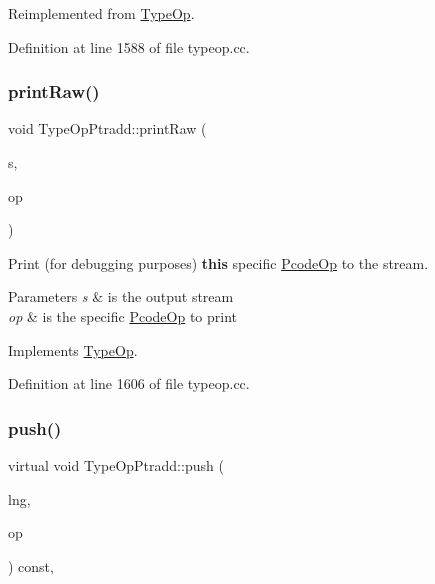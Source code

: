 Reimplemented from \mbox{\hyperlink{class_type_op_a7150ac93bb03a993735c829deb5237e7}{Type\+Op}}.



Definition at line 1588 of file typeop.\+cc.

\mbox{\label{class_type_op_ptradd_ae1e4fe840185e871ee6b46e7235ca7b8}} 
\subsubsection{\texorpdfstring{printRaw()}{printRaw()}}
{\footnotesize\ttfamily void Type\+Op\+Ptradd\+::print\+Raw (\begin{DoxyParamCaption}\item[{ostream \&}]{s,  }\item[{const \mbox{\hyperlink{class_pcode_op}{Pcode\+Op}} $\ast$}]{op }\end{DoxyParamCaption})\hspace{0.3cm}{\ttfamily [virtual]}}



Print (for debugging purposes) {\bfseries{this}} specific \mbox{\hyperlink{class_pcode_op}{Pcode\+Op}} to the stream. 


\begin{DoxyParams}{Parameters}
{\em s} & is the output stream \\
\hline
{\em op} & is the specific \mbox{\hyperlink{class_pcode_op}{Pcode\+Op}} to print \\
\hline
\end{DoxyParams}


Implements \mbox{\hyperlink{class_type_op_a60717e486917a30cc7cb6e3ce02585e1}{Type\+Op}}.



Definition at line 1606 of file typeop.\+cc.

\mbox{\label{class_type_op_ptradd_a970a05b6c01a70ecad769c461cbf40af}} 
\subsubsection{\texorpdfstring{push()}{push()}}
{\footnotesize\ttfamily virtual void Type\+Op\+Ptradd\+::push (\begin{DoxyParamCaption}\item[{\mbox{\hyperlink{class_print_language}{Print\+Language}} $\ast$}]{lng,  }\item[{const \mbox{\hyperlink{class_pcode_op}{Pcode\+Op}} $\ast$}]{op }\end{DoxyParamCaption}) const\hspace{0.3cm}{\ttfamily [inline]}, {\ttfamily [virtual]}}



